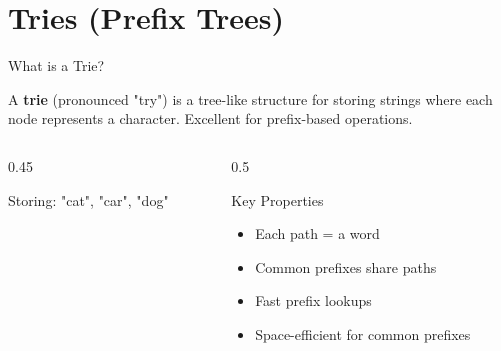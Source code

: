 \documentclass[aspectratio=169,xcolor=dvipsnames]{beamer}
\begin{document}
\section{Tries (Prefix Trees)}

\begin{frame}{What is a Trie?}
  \begin{definition}
    A \textbf{trie} (pronounced "try") is a tree-like structure for storing strings where each node represents a character. Excellent for prefix-based operations.
  \end{definition}

  \vspace{0.3cm}

  \begin{columns}
    \begin{column}{0.45\textwidth}
      \begin{block}{Storing: "cat", "car", "dog"}
      \end{block}
    \end{column}
    \begin{column}{0.5\textwidth}
      \begin{block}{Key Properties}
        \begin{itemize}
          \item Each path = a word
          \item Common prefixes share paths
          \item Fast prefix lookups
          \item Space-efficient for common prefixes
        \end{itemize}
      \end{block}


\end{column}
\end{columns}
\end{frame}
\end{document}
